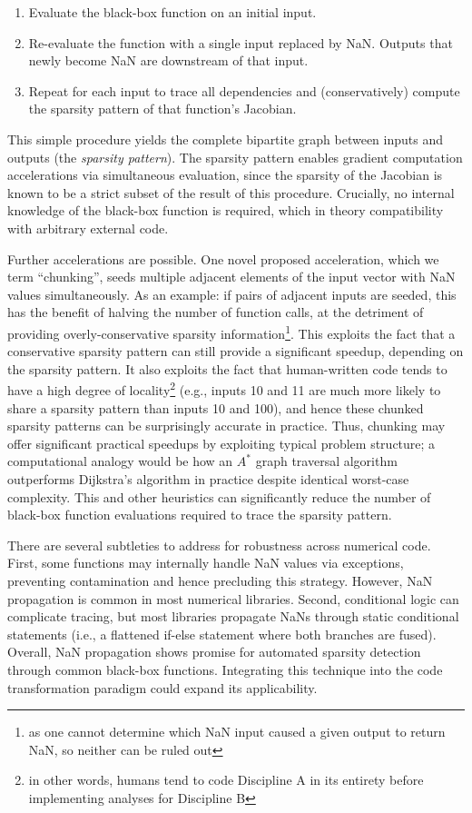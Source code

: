 \documentclass[12pt,vi,oneside,table]{report}
\begin{document}
    \begin{enumerate}
        \item Evaluate the black-box function on an initial input.
        \item Re-evaluate the function with a single input replaced by NaN. Outputs that newly become NaN are downstream of that input.
        \item Repeat for each input to trace all dependencies and (conservatively) compute the sparsity pattern of that function's Jacobian.
    \end{enumerate}
    This simple procedure yields the complete bipartite graph between inputs and outputs (the \textit{sparsity pattern}). The sparsity pattern enables gradient computation accelerations via simultaneous evaluation, since the sparsity of the Jacobian is known to be a strict subset of the result of this procedure. Crucially, no internal knowledge of the black-box function is required, which in theory compatibility with arbitrary external code.

    Further accelerations are possible. One novel proposed acceleration, which we term ``chunking'', seeds multiple adjacent elements of the input vector with NaN values simultaneously. As an example: if pairs of adjacent inputs are seeded, this has the benefit of halving the number of function calls, at the detriment of providing overly-conservative sparsity information\footnote{as one cannot determine which NaN input caused a given output to return NaN, so neither can be ruled out}. This exploits the fact that a conservative sparsity pattern can still provide a significant speedup, depending on the sparsity pattern. It also exploits the fact that human-written code tends to have a high degree of locality\footnote{in other words, humans tend to code Discipline A in its entirety before implementing analyses for Discipline B} (e.g., inputs 10 and 11 are much more likely to share a sparsity pattern than inputs 10 and 100), and hence these chunked sparsity patterns can be surprisingly accurate in practice. Thus, chunking may offer significant practical speedups by exploiting typical problem structure; a computational analogy would be how an $A^*$ graph traversal algorithm outperforms Dijkstra's algorithm in practice despite identical worst-case complexity. This and other heuristics can significantly reduce the number of black-box function evaluations required to trace the sparsity pattern.

    There are several subtleties to address for robustness across numerical code. First, some functions may internally handle NaN values via exceptions, preventing contamination and hence precluding this strategy. However, NaN propagation is common in most numerical libraries. Second, conditional logic can complicate tracing, but most libraries propagate NaNs through static conditional statements (i.e., a flattened if-else statement where both branches are fused). Overall, NaN propagation shows promise for automated sparsity detection through common black-box functions. Integrating this technique into the code transformation paradigm could expand its applicability.
\end{document}
